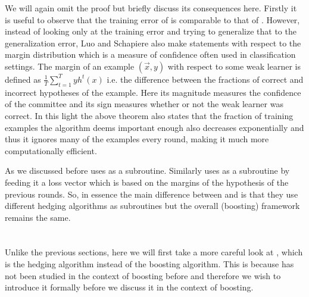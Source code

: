  We will again omit the proof but briefly discuss its consequences here. Firstly it is useful to observe that the training error of \NHB is comparable to that of \adaB. However, instead of looking only at the training error and trying to generalize that to the generalization error, Luo and Schapiere also make statements with respect to the margin distribution which is a measure of confidence often used in classification settings. The margin of an example $(\vec x , y)$ with respect to some weak learner is defined as $\frac1T \sum^T_{t=1}yh^t(x)$ i.e. the difference between the fractions of correct and incorrect hypotheses of the example. Here its magnitude measures the confidence of the committee and its sign measures whether or not the weak learner was correct. In this light the above theorem also states that the fraction of training examples the algorithm deems important enough also decreases exponentially and thus it ignores many of the examples every round, making it much more computationally efficient.

 \par As we discussed before \adaB uses \hedge as a subroutine. Similarly \NHB uses \adaN as a subroutine by feeding it a loss vector which is based on the margins of the hypothesis of the previous rounds. So, in essence the main difference between \NHB and \adaB is that they use different hedging algorithms as subroutines but the overall (boosting) framework remains the same.


\section{\squintB}
\label{sec:squintB}
Unlike the previous sections, here we will first take a more careful look at \squint, which is the hedging algorithm instead of the boosting algorithm. This is because \squint has not been studied in the context of boosting before and therefore we wish to introduce it formally before we discuss it in the context of boosting. 

